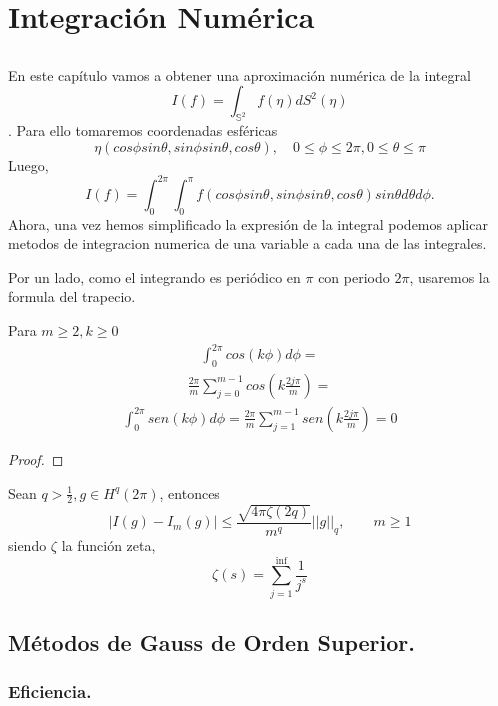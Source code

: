 \chapter[Integración Numérica]{Integración Numérica}
\section{}
En este capítulo vamos a obtener una aproximación numérica de la integral $$ I(f) = \int_{\mathds{S}^2} f(\eta) dS^2(\eta) $$. Para ello tomaremos coordenadas esféricas $$ \eta (cos\phi sin\theta, sin\phi sin\theta,cos \theta), \quad 0\le \phi \le 2\pi, 0\le \theta \le \pi$$
 Luego, 
$$
I(f) = \int_{0}^{2\pi} \int_{0}^{\pi} f(cos\phi sin\theta, sin\phi sin\theta,cos \theta)sin\theta d\theta d\phi. 
$$
Ahora, una vez hemos simplificado la expresión de la integral podemos aplicar metodos de integracion numerica de una variable a cada una de las integrales.

Por un lado, como el integrando es periódico en $\pi$ con periodo $2\pi$, usaremos la formula del trapecio.
\begin{lem} Para $m\ge 2,k\ge 0$
	\begin{gather}
	\int_{0}^{2\pi} cos(k\phi)d\phi = 
	\end{gather}
	\begin{gather}
	\frac{2\pi}{m}\sum_{j=0}^{m-1}cos(k\frac{2j\pi}{m}) = 
	\end{gather}
	\begin{gather}
		\int_{0}^{2\pi} sen(k\phi)d\phi =  \frac{2\pi}{m}\sum_{j=1}^{m-1}sen(k\frac{2j\pi}{m}) =0 
	\end{gather}
\end{lem}
\begin{proof}
	
\end{proof}
\begin{thm}Sean $q > \frac{1}{2}, g\in H^q(2\pi)$, entonces
	$$
	| I(g) - I_m(g) | \le \frac{\sqrt{4\pi\zeta(2q)}}{m^q} ||g||_q, \qquad m\ge 1
	$$  
	siendo $\zeta$ la función zeta,
	$$\zeta(s) = \sum_{j=1}^{\inf} \frac{1}{j^s}$$
\end{thm}

\section{Métodos de Gauss de Orden Superior.}
\subsection{Eficiencia.}
